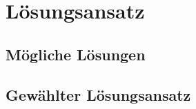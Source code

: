 \chapter{Lösungsansatz}
\label{sec:S4_Lösungsansatz}

\section{Mögliche Lösungen}

\section{Gewählter Lösungsansatz}
